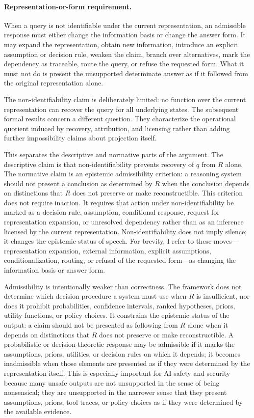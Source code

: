 \documentclass[11pt]{article}
\theoremstyle{definition}
\theoremstyle{remark}
\begin{document}
\paragraph{Representation-or-form requirement.}
When a query is not identifiable under the current representation, an admissible response must either change the information basis or change the answer form. It may expand the representation, obtain new information, introduce an explicit assumption or decision rule, weaken the claim, branch over alternatives, mark the dependency as traceable, route the query, or refuse the requested form. What it must not do is present the unsupported determinate answer as if it followed from the original representation alone.

The non-identifiability claim is deliberately limited: no function over the current representation can recover the query for all underlying states. The subsequent formal results concern a different question. They characterize the operational quotient induced by recovery, attribution, and licensing rather than adding further impossibility claims about projection itself.

This separates the descriptive and normative parts of the argument. The descriptive claim is that non-identifiability prevents recovery of $q$ from $R$ alone. The normative claim is an epistemic admissibility criterion: a reasoning system should not present a conclusion as determined by $R$ when the conclusion depends on distinctions that $R$ does not preserve or make reconstructible. This criterion does not require inaction. It requires that action under non-identifiability be marked as a decision rule, assumption, conditional response, request for representation expansion, or unresolved dependency rather than as an inference licensed by the current representation. Non-identifiability does not imply silence; it changes the epistemic status of speech. For brevity, I refer to these moves---representation expansion, external information, explicit assumptions, conditionalization, routing, or refusal of the requested form---as changing the information basis or answer form.

Admissibility is intentionally weaker than correctness. The framework does not determine which decision procedure a system must use when $R$ is insufficient, nor does it prohibit probabilities, confidence intervals, ranked hypotheses, priors, utility functions, or policy choices. It constrains the epistemic status of the output: a claim should not be presented as following from $R$ alone when it depends on distinctions that $R$ does not preserve or make reconstructible. A probabilistic or decision-theoretic response may be admissible if it marks the assumptions, priors, utilities, or decision rules on which it depends; it becomes inadmissible when those elements are presented as if they were determined by the representation itself. This is especially important for AI safety and security because many unsafe outputs are not unsupported in the sense of being nonsensical; they are unsupported in the narrower sense that they present assumptions, priors, tool traces, or policy choices as if they were determined by the available evidence.
\end{document}
